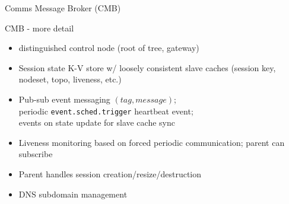 \documentclass[default,pdf,colorBG,slideColor]{prosper}
\begin{document}
\begin{slide}{Comms Message Broker (CMB)}
{\begin{minipage}[b]{0.18\linewidth}
\end{minipage}
\hspace{0.5cm}
\begin{minipage}[b]{0.18\linewidth}
\end{minipage}
}\end{slide}
\begin{slide}{CMB - more detail}{\small
\begin{itemize}
  \item{distinguished control node (root of tree, gateway)}
  \item{Session state K-V store w/ loosely consistent slave caches
	(session key, nodeset, topo, liveness, etc.)}
  \item{Pub-sub event messaging $(tag, message)$;\\
	periodic {\tt event.sched.trigger} heartbeat event;\\
	events on state update for slave cache sync}
  \item{Liveness monitoring based on forced periodic communication;
	parent can subscribe}
  \item{Parent handles session creation/resize/destruction}
  \item{DNS subdomain management}
\end{itemize}
}\end{slide}
\end{document}
